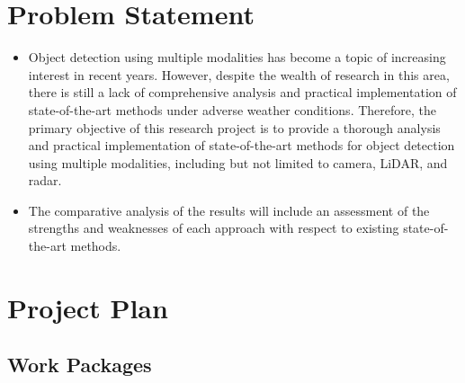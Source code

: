 \documentclass[thesis]{mas_proposal}
\begin{document}
\section{Problem Statement}
\begin{itemize}



      \item Object detection using multiple modalities has become a topic of increasing interest in recent years. However, despite the wealth of research in this area, there is still a lack of comprehensive analysis and practical implementation of state-of-the-art methods under adverse weather conditions. Therefore, the primary objective of this research project is to provide a thorough analysis and practical implementation of state-of-the-art methods for object detection using multiple modalities, including but not limited to camera, LiDAR, and radar.
      
      \item The comparative analysis of the results will include an assessment of the strengths and weaknesses of each approach with respect to existing state-of-the-art methods.

\end{itemize}

\section{Project Plan}

\subsection{Work Packages}
\end{document}
